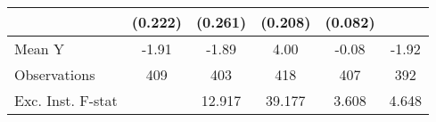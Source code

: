 {\begin{tabular}{l*{5}{c}}
            &     (0.222)         &     (0.261)         &     (0.208)         &     (0.082)         &                     \\
\midrule
Mean Y      &       -1.91         &       -1.89         &        4.00         &       -0.08         &       -1.92         \\
Observations&         409         &         403         &         418         &         407         &         392         \\
Exc. Inst. F-stat&                     &      12.917         &      39.177         &       3.608         &       4.648         \\
\bottomrule
\end{tabular}
}
